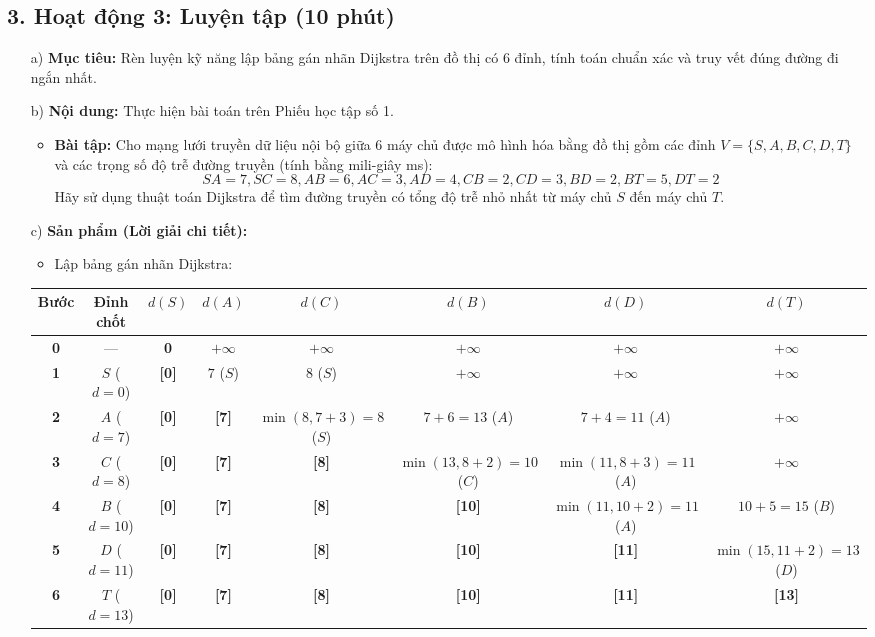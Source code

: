 \documentclass[12pt, a4paper]{article}
\begin{document}
\subsection*{3. Hoạt động 3: Luyện tập (10 phút)}

\begin{itemize}[leftmargin=1.2cm]
    \item[a)] \textbf{Mục tiêu:} Rèn luyện kỹ năng lập bảng gán nhãn Dijkstra trên đồ thị có 6 đỉnh, tính toán chuẩn xác và truy vết đúng đường đi ngắn nhất.
    \item[b)] \textbf{Nội dung:} Thực hiện bài toán trên Phiếu học tập số 1.
    \begin{itemize}[leftmargin=0.6cm]
        \item \textbf{Bài tập:} Cho mạng lưới truyền dữ liệu nội bộ giữa 6 máy chủ được mô hình hóa bằng đồ thị gồm các đỉnh $V = \{S, A, B, C, D, T\}$ và các trọng số độ trễ đường truyền (tính bằng mili-giây ms):
        $$SA = 7, SC = 8, AB = 6, AC = 3, AD = 4, CB = 2, CD = 3, BD = 2, BT = 5, DT = 2$$
        Hãy sử dụng thuật toán Dijkstra để tìm đường truyền có tổng độ trễ nhỏ nhất từ máy chủ $S$ đến máy chủ $T$.
    \end{itemize}

    \item[c)] \textbf{Sản phẩm (Lời giải chi tiết):}
    \begin{itemize}[leftmargin=0.6cm]
        \item Lập bảng gán nhãn Dijkstra:
    \end{itemize}

    \begin{center}
    \begin{tabular}{|c|c|c|c|c|c|c|c|}
    \hline
    \textbf{Bước} & \textbf{Đỉnh chốt} & $d(S)$ & $d(A)$ & $d(C)$ & $d(B)$ & $d(D)$ & $d(T)$ \\ \hline
    \textbf{0} & --- & \textbf{0} & $+\infty$ & $+\infty$ & $+\infty$ & $+\infty$ & $+\infty$ \\ \hline
    \textbf{1} & $S$ ($d=0$) & \textbf{[0]} & $7$ ($S$) & $8$ ($S$) & $+\infty$ & $+\infty$ & $+\infty$ \\ \hline
    \textbf{2} & $A$ ($d=7$) & \textbf{[0]} & \textbf{[7]} & $\min(8, 7+3)=8$ ($S$) & $7+6=13$ ($A$) & $7+4=11$ ($A$) & $+\infty$ \\ \hline
    \textbf{3} & $C$ ($d=8$) & \textbf{[0]} & \textbf{[7]} & \textbf{[8]} & $\min(13, 8+2)=10$ ($C$) & $\min(11, 8+3)=11$ ($A$) & $+\infty$ \\ \hline
    \textbf{4} & $B$ ($d=10$) & \textbf{[0]} & \textbf{[7]} & \textbf{[8]} & \textbf{[10]} & $\min(11, 10+2)=11$ ($A$) & $10+5=15$ ($B$) \\ \hline
    \textbf{5} & $D$ ($d=11$) & \textbf{[0]} & \textbf{[7]} & \textbf{[8]} & \textbf{[10]} & \textbf{[11]} & $\min(15, 11+2)=13$ ($D$) \\ \hline
    \textbf{6} & $T$ ($d=13$) & \textbf{[0]} & \textbf{[7]} & \textbf{[8]} & \textbf{[10]} & \textbf{[11]} & \textbf{[13]} \\ \hline
    \end{tabular}
    \end{center}


\end{itemize}
\end{document}
